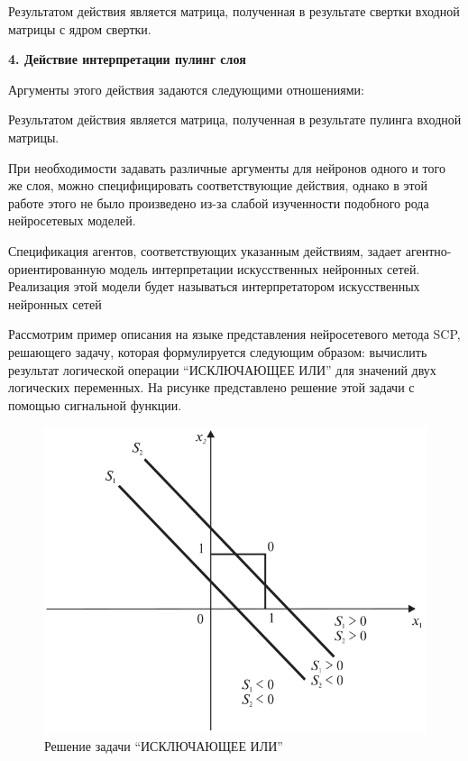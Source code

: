 Результатом действия является матрица, полученная в результате свертки входной матрицы с ядром свертки.


\textbf{4. Действие интерпретации пулинг слоя}

Аргументы этого действия задаются следующими отношениями:
\begin{SCn}



\end{SCn}

Результатом действия является матрица, полученная в результате пулинга входной матрицы.

При необходимости задавать различные аргументы для нейронов одного и того же слоя, можно специфицировать соответствующие действия, однако в этой работе этого не было произведено из-за слабой изученности подобного рода нейросетевых моделей.

Спецификация агентов, соответствующих указанным действиям, задает агентно-ориентированную модель интерпретации искусственных нейронных сетей. Реализация этой модели будет называться интерпретатором искусственных нейронных сетей

Рассмотрим пример описания на языке представления нейросетевого метода SCP, решающего задачу, которая формулируется следующим образом: вычислить результат логической операции ``ИСКЛЮЧАЮЩЕЕ ИЛИ'' для значений двух логических переменных. На рисунке  представлено решение этой задачи с помощью сигнальной функции.

\begin{figure}
	\centering
	\includegraphics[width=0.5\linewidth]{author/part3/figures/strong_or_graphic.png}
	\caption{Решение задачи ``ИСКЛЮЧАЮЩЕЕ ИЛИ'' }
	\label{fig:strong_or_graphic}
\end{figure}

